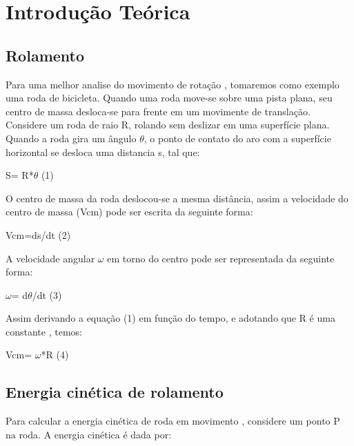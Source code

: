 \documentclass[
	12pt,				%
	oneside,			%
	a4paper,			%
	english,			%
	french,				%
	spanish,			%
	brazil,				%
	]{abntex2}
\begin{document}

\newpage
\section[Introdução Teórica]{Introdução Teórica}
\pagestyle{fancy}
\subsection[Rolamento]{Rolamento} 
Para uma melhor analise do movimento de rotação , tomaremos como exemplo  uma roda de bicicleta.
Quando uma roda move-se sobre uma pista plana, seu centro de massa desloca-se para frente em um movimente de translação. 
Considere um roda de raio R, rolando sem deslizar em uma superfície plana. Quando a roda gira um ângulo $\theta$, o ponto de contato do aro com a superfície  horizontal se desloca uma distancia s, tal que:

S= R*$\theta$ (1)

O centro de massa da roda deslocou-se a mesma distância, assim a velocidade do centro de massa (Vcm) pode ser escrita da seguinte forma:

Vcm=ds/dt  (2)

A velocidade angular $\omega$ em torno do centro pode ser representada da seguinte forma:

$\omega$= d$\theta$/dt  (3) 

Assim derivando a equação (1) em função do tempo, e adotando que R é uma constante , temos:

Vcm= $\omega$*R  (4)

\subsection[Energia cinética de rolamento]{Energia cinética de rolamento} 
Para calcular a energia cinética de roda em movimento , considere um  ponto P na roda. A energia cinética é dada por:
\end{document}
